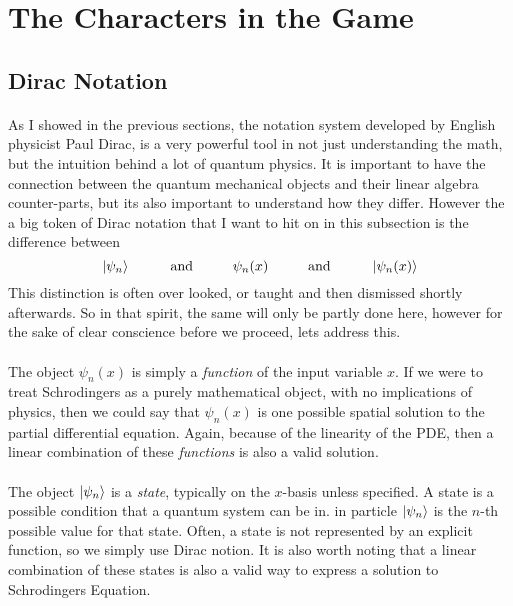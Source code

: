 \documentclass[12pt,letterpaper]{book}
\begin{document}
\section{The Characters in the Game}


\subsection*{Dirac Notation}

\paragraph*{}As I showed in the previous sections, the notation system developed by English physicist Paul Dirac, is a very powerful tool in not just understanding the math, but the intuition behind a lot of quantum physics. It is important to have the connection between the quantum mechanical objects and their linear algebra counter-parts, but its also important to understand how they differ. However the a big token of Dirac notation that I want to hit on in this subsection is the difference between
\begin{equation}
\ket{\psi_n}  \hspace{1cm} \text{and} \hspace{1cm}  \psi_n(x)
\hspace{1cm} \text{and} \hspace{1cm} \ket{\psi_n(x)}
\end{equation}
This distinction is often over looked, or taught and then dismissed shortly afterwards. So in that spirit, the same will only be partly done here, however for the sake of clear conscience before we proceed, lets address this.

\paragraph*{}The object $\psi_n(x)$ is simply a \textit{function} of the input variable $x$. If we were to treat Schrodingers as a purely mathematical object, with no implications of physics, then we could say that $\psi_n(x)$ is one possible spatial solution to the partial differential equation. Again, because of the linearity of the PDE, then a linear combination of these \textit{functions} is also a valid solution.

\paragraph*{}The object $\ket{\psi_n}$ is a \textit{state}, typically on the $x$-basis unless specified. A state is a possible condition that a quantum system can be in. in particle $\ket{\psi_n}$ is the $n$-th possible value for that state. Often, a state is not represented by an explicit function, so we simply use Dirac notion. It is also worth noting that a linear combination of these states is also a valid way to express a solution to Schrodingers Equation.
\end{document}
